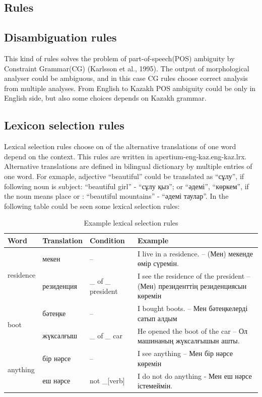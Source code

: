 \documentclass[11pt]{article}
\begin{document}
\subsection{Rules}

\subsection{Disambiguation rules}

This kind of rules solves the problem of part-of-speech(POS) ambiguity by Constraint Grammar(CG) (Karlsson et al., 1995). The output of morphological analyser could be ambiguous, and in this case CG rules choose correct analysis from multiple analyses. From English to Kazakh POS ambiguity could be only in English side, but also some choices depends on Kazakh grammar.

\subsection{Lexicon selection rules }

Lexical selection rules choose on of the alternative translations of one word depend on the context. This rules are written in apertium-eng-kaz.eng-kaz.lrx. Alternative translations are defined in bilingual dictionary by multiple entries of one word. For exmaple, adjective ``beautiful'' could be translated as ``сұлу'', if following noun is subject: ``beautiful girl'' - ``сұлу қыз''; or ``әдемі'', ``көркем'', if the noun means place or : ``beautiful mountains'' - ``әдемі таулар''.  In the following table could be seen some lexical selection rules:

\begin{table}
 \centering
 \begin{tabular}{|l|l|l|l|}
    \hline
    \textbf{Word} & \textbf{Translation} & \textbf{Condition} & \textbf{Example} \\
    \hline
    \multirow{2}{*}{residence} & мекен & -- & I live in a residence. -- (Мен) мекенде өмір сүремін. \\
                               & резиденция & \_ of \_ president & I see the residence of the president -- (Мен) президенттің резиденциясын көремін \\
    \hline
    \multirow{2}{*}{boot} & бәтеңке & -- & I bought boots. -- Мен бәтеңкелерді сатып алдым \\
                          & жүксалғыш & \_ of \_ car &  He opened the boot of the car  -- Ол машинаның жүксалғышын ашты. \\
    \hline
    \multirow{2}{*}{anything} & бір нәрсе & -- & I  see anything -- Мен бір нәрсе көремін \\
                              & еш нәрсе & not \_[verb] & I do not do anything - Мен еш нәрсе істемеймін. \\

    \hline
 \end{tabular}
  \caption{Example lexical selection rules}
\end{table}
\end{document}
